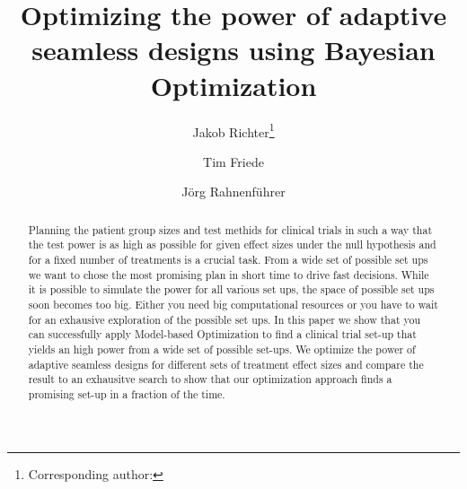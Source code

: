 \documentclass[bimj,fleqn]{w-art}
\theoremstyle{plain}
\theoremstyle{definition}
\begin{document}

\title[Model-based Optimization of Adaptive Seamless Designs]{Optimizing the power of adaptive seamless designs using Bayesian Optimization} %
\author[Jakob Richter {\it{et al.}}]{Jakob Richter\footnote{Corresponding author: {}}} 
\address[\inst{1}]{Fakultät Statistik, Technische Universität Dortmund, 44221 Dortmund}
\author[dd]{Tim Friede}
\address[\inst{2}]{Second address} %
\author[]{Jörg Rahnenführer} %
   

\begin{abstract}
Planning the patient group sizes and test methids for clinical trials in such a way that the test power is as high as possible for given effect sizes under the null hypothesis and for a fixed number of treatments is a crucial task.
From a wide set of possible set ups we want to chose the most promising plan in short time to drive fast decisions.
While it is possible to simulate the power for all various set ups, the space of possible set ups soon becomes too big.
Either you need big computational resources or you have to wait for an exhausive exploration of the possible set ups.
In this paper we show that you can successfully apply Model-based Optimization to find a clinical trial set-up that yields an high power from a wide set of possible set-ups.
We optimize the power of adaptive seamless designs for different sets of treatment effect sizes and compare the result to an exhausitve search to show that our optimization approach finds a promising set-up in a fraction of the time.
\end{abstract}
\end{document}
